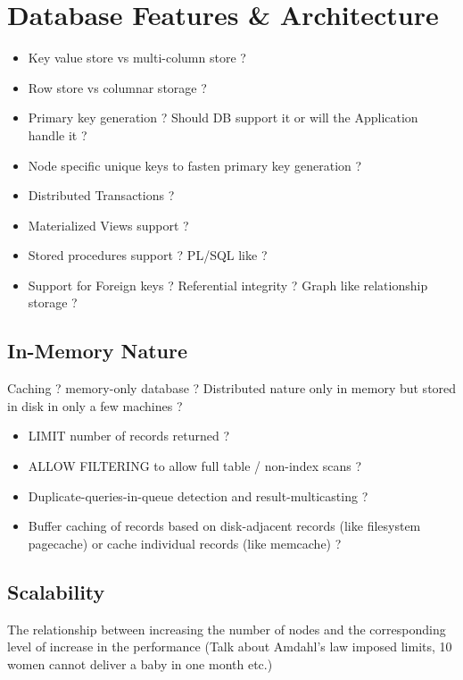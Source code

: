 \section{Database Features & Architecture}

\begin{itemize}
\item Key value store vs multi-column store ?
\end{itemize}
\begin{itemize}
\item Row store vs columnar storage ?
\end{itemize}
\begin{itemize}
\item Primary key generation ? Should DB support it or will the Application handle it ?
\end{itemize}
\begin{itemize}
\item Node specific unique keys to fasten primary key generation ?
\end{itemize}
\begin{itemize}
\item Distributed Transactions ?
\end{itemize}
\begin{itemize}
\item Materialized Views support ?
\end{itemize}
\begin{itemize}
\item Stored procedures support ? PL/SQL like ?
\end{itemize}
\begin{itemize}
\item Support for Foreign keys ? Referential integrity ? Graph like relationship storage ?
\end{itemize}

\subsection{In-Memory Nature}
Caching ?
memory-only database ?
Distributed nature only in memory but stored in disk in only a few machines ?

\begin{itemize}
\item LIMIT number of records returned ?
\end{itemize}
\begin{itemize}
\item ALLOW FILTERING to allow full table / non-index scans ?
\end{itemize}
\begin{itemize}
\item Duplicate-queries-in-queue detection and result-multicasting ?
\end{itemize}
\begin{itemize}
\item Buffer caching of records based on disk-adjacent records (like filesystem pagecache) or cache individual records (like memcache) ?
\end{itemize}

\subsection{Scalability}
The relationship between increasing the number of nodes and the corresponding level of increase in the performance (Talk about Amdahl's law imposed limits, 10 women cannot deliver a baby in one month etc.)